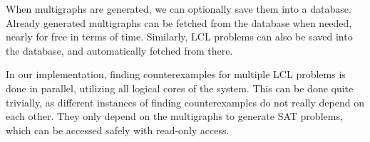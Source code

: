 When multigraphs are generated, we can optionally save them into a database.
Already generated multigraphs can be fetched from the database when needed, nearly for free in terms of time.
Similarly, LCL problems can also be saved into the database, and automatically fetched from there.

In our implementation, finding counterexamples for multiple LCL problems is done in parallel, utilizing all logical cores of the system.
This can be done quite trivially, as different instances of finding counterexamples do not really depend on each other.
They only depend on the multigraphs to generate SAT problems, which can be accessed safely with read-only access.
